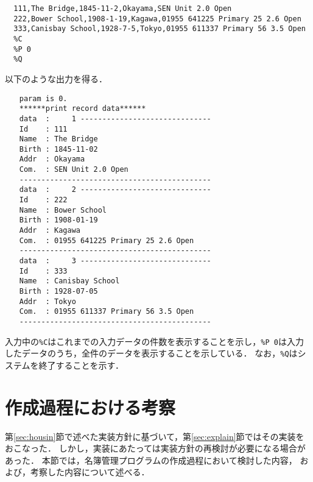 \documentclass[a4j,11pt]{jarticle}
\begin{document}
{\fontsize{10pt}{11pt} \selectfont
 \begin{verbatim}
  111,The Bridge,1845-11-2,Okayama,SEN Unit 2.0 Open
  222,Bower School,1908-1-19,Kagawa,01955 641225 Primary 25 2.6 Open
  333,Canisbay School,1928-7-5,Tokyo,01955 611337 Primary 56 3.5 Open
  %C
  %P 0
  %Q
 \end{verbatim}
}
\noindent %
以下のような出力を得る．

{\fontsize{10pt}{11pt} \selectfont
 \begin{verbatim}
　　param is 0.
　　******print record data******
　　data  :     1 ------------------------------
　　Id    : 111
　　Name  : The Bridge
　　Birth : 1845-11-02
　　Addr  : Okayama
　　Com.  : SEN Unit 2.0 Open
　　--------------------------------------------
　　data  :     2 ------------------------------
　　Id    : 222
　　Name  : Bower School
　　Birth : 1908-01-19
　　Addr  : Kagawa
　　Com.  : 01955 641225 Primary 25 2.6 Open
　　--------------------------------------------
　　data  :     3 ------------------------------
　　Id    : 333
　　Name  : Canisbay School
　　Birth : 1928-07-05
　　Addr  : Tokyo
　　Com.  : 01955 611337 Primary 56 3.5 Open
　　--------------------------------------------

 \end{verbatim}
}

\noindent
入力中の\verb|%C|はこれまでの入力データの件数を表示することを示し，\verb|%P 0|は入力したデータのうち，全件のデータを表示することを示している．
なお，\verb|%Q|はシステムを終了することを示す．

\section{作成過程における考察}


第\ref{sec:housin}節で述べた実装方針に基づいて，第\ref{sec:explain}節ではその実装をおこなった．
しかし，実装にあたっては実装方針の再検討が必要になる場合があった．
本節では，名簿管理プログラムの作成過程において検討した内容，
および，考察した内容について述べる．
\end{document}
